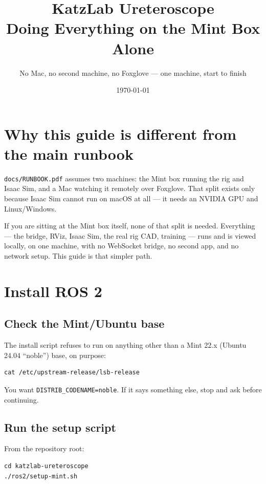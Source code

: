 \documentclass[11pt]{article}
\title{\textbf{\color{katzblue} KatzLab Ureteroscope}\\[4pt]
Doing Everything on the Mint Box Alone}
\author{No Mac, no second machine, no Foxglove --- one machine, start to finish}
\date{\today}
\begin{document}
\maketitle
\thispagestyle{fancy}

\section*{Why this guide is different from the main runbook}
\texttt{docs/RUNBOOK.pdf} assumes two machines: the Mint box running the
rig and Isaac Sim, and a Mac watching it remotely over Foxglove. That
split exists only because Isaac Sim cannot run on macOS at all --- it
needs an NVIDIA GPU and Linux/Windows.

If you are sitting at the Mint box itself, none of that split is needed.
Everything --- the bridge, RViz, Isaac Sim, the real rig CAD, training ---
runs and is viewed locally, on one machine, with no WebSocket bridge, no
second app, and no network setup. This guide is that simpler path.

\tableofcontents
\newpage

\section{Install ROS 2}

\subsection{Check the Mint/Ubuntu base}
The install script refuses to run on anything other than a Mint 22.x
(Ubuntu 24.04 ``noble'') base, on purpose:

\begin{lstlisting}
cat /etc/upstream-release/lsb-release
\end{lstlisting}

You want \texttt{DISTRIB\_CODENAME=noble}. If it says something else,
stop and ask before continuing.

\subsection{Run the setup script}
From the repository root:

\begin{lstlisting}
cd katzlab-ureteroscope
./ros2/setup-mint.sh
\end{lstlisting}
\end{document}
